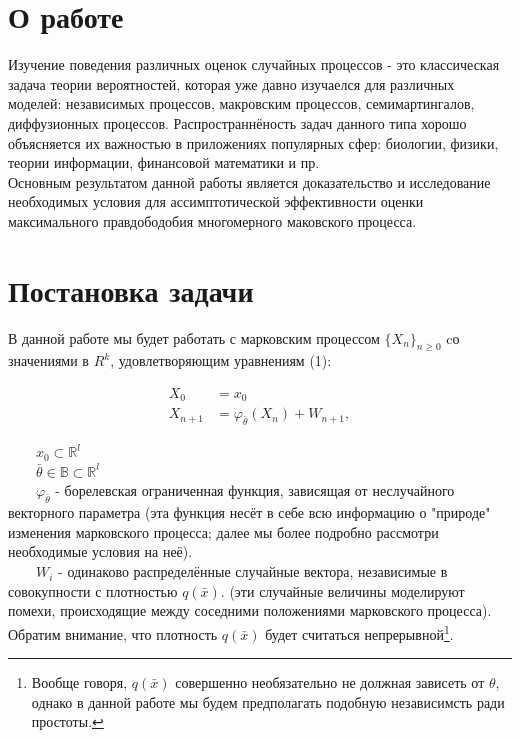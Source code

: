 \newtheorem{Theorem}{Теорема}
\newtheorem{Proof}{Доказательство теоремы}
\newtheorem{Definition}{Определение}
\newtheorem{Lemma}{Лемма}
\newtheorem{Designation}{Обозначение}


\newpage
\section{О работе}
\cite{CramerRaoDiffenition}
\cite{VeretennikovLectures16}
Изучение поведения различных оценок случайных процессов - это классическая задача теории вероятностей, которая уже давно изучаелся для различных моделей: независимых процессов, макровским процессов, семимартингалов, диффузионных процессов. Распространнёность задач данного типа хорошо объясняется их важностью в приложениях популярных сфер: биологии, физики, теории информации, финансовой математики и пр.
\\
Основным результатом данной работы является доказательство и исследование необходимых условия для ассимптотической эффективности оценки максимального правдободобия многомерного маковского процесса.
\newpage

\section{Постановка задачи}
В данной работе мы будет работать с марковским процессом $\{X_n\}_{n \geqslant 0}$ cо значениями в $R^k$, удовлетворяющим уравнениям (1):

\begin{equation} \label{process_definition}
    \begin{split}
    X_0 &= x_0 \\
    X_{n+1} &=\varphi_{\bar{\theta}}\left(X_n\right)+W_{n+1},
    \end{split}
\end{equation}
\begin{flushleft}
	{
		\setlength{\leftskip}{5em}
			\setlength{\rightskip}{5em}
		\ \ \ \ $x_0 \subset \mathbb{R}^l$ \\
		\ \ \ \ $\bar{\theta} \in \mathbb{B}\subset \mathbb{R}^l$ \\
		\ \ \ \ $\varphi_{\bar{\theta}}$ - борелевская ограниченная функция, зависящая от неслучайного векторного параметра (эта функция несёт в себе всю информацию о "природе" изменения марковского процесса; далее мы более подробно рассмотри необходимые условия на неё). \\
		\ \ \ \ $W_i$ - одинаково распределённые случайные вектора, независимые в совокупности с плотностью $q(\bar{x})$. (эти случайные величины моделируют помехи, происходящие между соседними положениями марковского процесса). Обратим внимание, что плотность $q(\bar{x})$ будет считаться непрерывной\footnote{Вообще говоря, $q(\bar{x})$ совершенно необязательно не должная зависеть от $\theta$, однако в данной работе мы будем предполагать подобную независимсть ради простоты.}. \\
	}
\end{flushleft}

